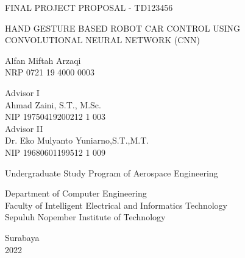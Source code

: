 \begin{large}
  FINAL PROJECT PROPOSAL - TD123456
\end{large}

\vspace{\fill}

\begin{spacing}{1.5}
  \begin{Large}
    HAND GESTURE BASED ROBOT CAR CONTROL USING CONVOLUTIONAL NEURAL NETWORK (CNN)
  \end{Large}
\end{spacing}

\vspace{\fill}

\begin{large}
  Alfan Miftah Arzaqi \\
  \textnormal{NRP 0721 19 4000 0003}
\end{large}

\vspace{\fill}

\begin{large}
  \textnormal{Advisor I} \\
  Ahmad Zaini, S.T., M.Sc. \\
  \textnormal{NIP 19750419200212 1 003} \\
  \textnormal{Advisor II} \\
  Dr. Eko Mulyanto Yuniarno,S.T.,M.T. \\
  \textnormal{NIP 19680601199512 1 009}
\end{large}

\vspace{\fill}

Undergraduate Study Program of Aerospace Engineering \\

\normalfont

Department of Computer Engineering \\
Faculty of Intelligent Electrical and Informatics Technology\\
Sepuluh Nopember Institute of Technology

Surabaya \\
2022

